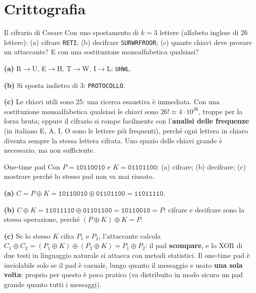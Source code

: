 \section{Crittografia}

\begin{esercizio}{Il cifrario di Cesare}
Con uno spostamento di $k = 3$ lettere (alfabeto inglese di 26 lettere): (a) cifrare \texttt{RETI}; (b) decifrare \texttt{SURWRFROOR};
(c) quante chiavi deve provare un attaccante? E con una sostituzione monoalfabetica qualsiasi?
\end{esercizio}

\svolgimento
\textbf{(a)} R$\rightarrow$U, E$\rightarrow$H, T$\rightarrow$W, I$\rightarrow$L: \texttt{UHWL}.

\textbf{(b)} Si sposta indietro di 3: \texttt{PROTOCOLLO}.

\textbf{(c)} Le chiavi utili sono 25: una ricerca esaustiva è immediata. Con una sostituzione monoalfabetica qualsiasi le chiavi sono
$26! \approx 4 \cdot 10^{26}$, troppe per la forza bruta; eppure il cifrario si rompe facilmente con l'\textbf{analisi delle frequenze}
(in italiano E, A, I, O sono le lettere più frequenti), perché ogni lettera in chiaro diventa sempre la stessa lettera cifrata. Uno spazio
delle chiavi grande è necessario, ma non sufficiente.

\begin{esercizio}{One-time pad}
Con $P = \texttt{10110010}$ e $K = \texttt{01101100}$: (a) cifrare; (b) decifrare; (c) mostrare perché lo stesso pad non va mai
riusato.
\end{esercizio}

\svolgimento
\textbf{(a)} $C = P \oplus K = \texttt{10110010} \oplus \texttt{01101100} = \texttt{11011110}$.

\textbf{(b)} $C \oplus K = \texttt{11011110} \oplus \texttt{01101100} = \texttt{10110010} = P$: cifrare e decifrare sono la stessa
operazione, perché $(P \oplus K) \oplus K = P$.

\textbf{(c)} Se lo stesso $K$ cifra $P_1$ e $P_2$, l'attaccante calcola
$C_1 \oplus C_2 = (P_1 \oplus K) \oplus (P_2 \oplus K) = P_1 \oplus P_2$: il pad \textbf{scompare}, e lo XOR di due testi in linguaggio
naturale si attacca con metodi statistici. Il one-time pad è inviolabile solo se il pad è casuale, lungo quanto il messaggio e usato
\textbf{una sola volta}: proprio per questo è poco pratico (va distribuito in modo sicuro un pad grande quanto tutti i messaggi).

